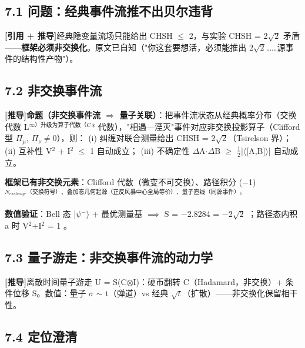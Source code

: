 \documentclass[12pt]{article}
\newcommand{\mtag}[1]{\textbf{[#1]}}
\newcommand{\up}[1]{\ensuremath{^{#1}}}
\newcommand{\down}[1]{\ensuremath{_{#1}}}
\begin{document}
\subsection{7.1 问题：经典事件流推不出贝尔违背}

\mtag{引用 + 推导}经典隐变量流场只能给出 CHSH \ensuremath{\leq} 2，与实验 CHSH = 2\ensuremath{\sqrt{2}} 矛盾------\textbf{框架必须非交换化}。原文已自知（"你这套要想活，必须能推出 2\ensuremath{\sqrt{2}}\ldots{}\ldots{}源事件的结构性产物"）。

\subsection{7.2 非交换事件流}

\mtag{推导}\textbf{命题（非交换事件流 \ensuremath{\Rightarrow} 量子关联）}：把事件流状态从经典概率分布（交换代数 L\up{\infty{}）升级为算子代数（C}* 代数），"相遇---湮灭"事件对应非交换投影算子（Clifford 型 {\ensuremath{\Pi}\down{\mu{}}, \ensuremath{\Pi}\down{\nu{}}}\ensuremath{\neq}0），则：
(i) 纠缠对联合测量给出 CHSH = 2\ensuremath{\sqrt{2}}（Tsirelson 界）；
(ii) 互补性 V\up{2} + I\up{2} \ensuremath{\leq} 1 自动成立；
(iii) 不确定性 \ensuremath{\Delta}A\ensuremath{\cdot}\ensuremath{\Delta}B \ensuremath{\geq} \ensuremath{\tfrac12}|\ensuremath{\langle}[A,B]\ensuremath{\rangle}| 自动成立。

\textbf{框架已有非交换元素}：Clifford 代数（微变不可交换）、路径积分 (\ensuremath{-}1)\up{N\down{exchange}（交换符号）、叠加态几何起源（正反风暴中心全局等价）、量子直线（同源事件）。}

\textbf{数值验证}：Bell 态 |\ensuremath{\psi}\up{-}\ensuremath{\rangle} + 最优测量基 \ensuremath{\implies} S = \ensuremath{-}2.8284 = \ensuremath{-}2\ensuremath{\sqrt{2}} \checkmark；路径态内积 a 时 V\up{2}+I\up{2} = 1 \checkmark。

\subsection{7.3 量子游走：非交换事件流的动力学}

\mtag{推导}离散时间量子游走 U = S(C\ensuremath{\otimes}I)：硬币翻转 C（Hadamard，非交换）+ 条件位移 S。数值：量子 \ensuremath{\sigma} \ensuremath{\sim} t（弹道）vs 经典 \ensuremath{\sqrt{t}}（扩散）------非交换化保留相干性。

\subsection{7.4 定位澄清}
\end{document}

